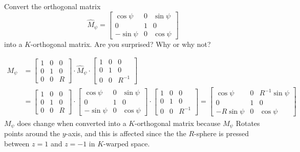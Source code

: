 \documentclass{ximera}
\begin{document}
\begin{problem}
  Convert the orthogonal matrix
  \[
  \hat{M}_\psi=\begin{bmatrix}
  \cos\psi & 0 & \sin\psi\\
  0 & 1 & 0\\
  -\sin\psi & 0 & \cos\psi
  \end{bmatrix}
  \]
  into a $K$-orthogonal matrix. Are you surprised? Why or why not?
  
\begin{freeResponse}
\begin{align*}
M_\psi &= \begin{bmatrix}
1 & 0 & 0\\
0 & 1 & 0\\
0 & 0 & R%
\end{bmatrix} \cdot \hat{M}_\psi \cdot
\begin{bmatrix}
1 & 0 & 0\\
0 & 1 & 0\\
0 & 0 & R^{-1}%
\end{bmatrix} \\
&= \begin{bmatrix}
1 & 0 & 0\\
0 & 1 & 0\\
0 & 0 & R%
\end{bmatrix} \cdot 
\begin{bmatrix}
  \cos\psi & 0 & \sin\psi\\
  0 & 1 & 0\\
  -\sin\psi & 0 & \cos\psi
  \end{bmatrix} \cdot
\begin{bmatrix}
1 & 0 & 0\\
0 & 1 & 0\\
0 & 0 & R^{-1}%
\end{bmatrix}
=\begin{bmatrix}
  \cos\psi & 0 & R^{-1} \sin\psi\\
  0 & 1 & 0\\
  -R\sin\psi & 0 & \cos\psi
  \end{bmatrix} 
\end{align*} 
$M_\psi$ does change when converted into a $K$-orthogonal matrix because $M_\psi$ Rotates points around the $y$-axis, and this is affected since the  the $R$-sphere is pressed between $z=1$ and $z=-1$ in $K$-warped space. 
\end{freeResponse}

\end{problem}
\end{document}
